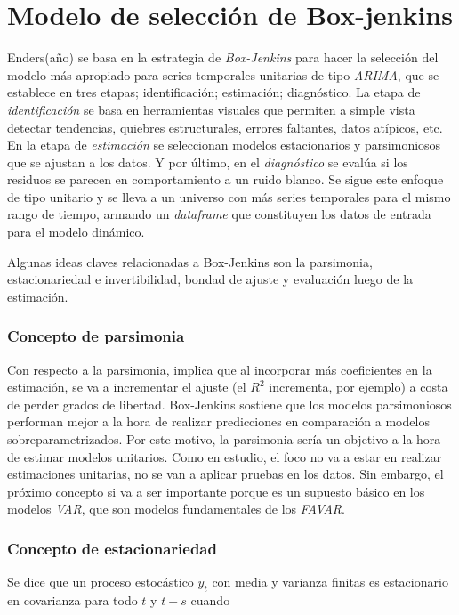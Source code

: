 \chapter{Modelo de selección de Box-jenkins}
\label{chap:box_jenkins_framework}
Enders(año) se basa en la estrategia de \textit{Box-Jenkins} para hacer la selección del modelo más apropiado para series temporales unitarias de tipo \textit{ARIMA}, que se establece en tres etapas; identificación; estimación; diagnóstico. La etapa de \textit{identificación} se basa en herramientas visuales que permiten a simple vista detectar tendencias, quiebres estructurales, errores faltantes, datos atípicos, etc.
En la etapa de \textit{estimación} se seleccionan modelos estacionarios y parsimoniosos que se ajustan a los datos. Y por último, en el \textit{diagnóstico} se evalúa si los residuos se parecen en comportamiento a un ruido blanco. Se sigue este enfoque de tipo unitario y se lleva a un universo con más series temporales para el mismo rango de tiempo, armando un \textit{dataframe} que constituyen los datos de entrada para el modelo dinámico.

Algunas ideas claves relacionadas a Box-Jenkins son la parsimonia, estacionariedad e invertibilidad, bondad de ajuste y evaluación luego de la estimación.

\subsection{Concepto de parsimonia}
Con respecto a la parsimonia, implica que al incorporar más coeficientes en la estimación, se va a incrementar el ajuste  (el $R^2$ incrementa, por ejemplo) a costa de perder grados de libertad. Box-Jenkins sostiene que los modelos parsimoniosos performan mejor a la hora de realizar predicciones en comparación a modelos sobreparametrizados. Por este motivo, la parsimonia sería un objetivo a la hora de estimar modelos unitarios. Como en estudio, el foco no va a estar en realizar estimaciones unitarias, no se van a aplicar pruebas en los datos. Sin embargo, el próximo concepto si va a ser importante porque es un supuesto básico en los modelos \textit{VAR}, que son modelos fundamentales de los \textit{FAVAR}.




\subsection{Concepto de estacionariedad}
Se dice que un proceso estocástico $y_t$ con media y varianza finitas es estacionario en covarianza para todo $t$ y $t-s$ cuando

